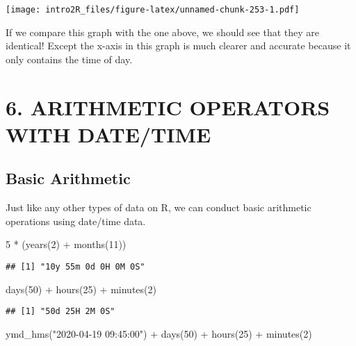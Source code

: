\documentclass[
]{book}
\newenvironment{Shaded}{\begin{snugshade}}{\end{snugshade}}
\newcommand{\DecValTok}[1]{\textcolor[rgb]{0.00,0.00,0.81}{#1}}
\newcommand{\FunctionTok}[1]{\textcolor[rgb]{0.00,0.00,0.00}{#1}}
\newcommand{\NormalTok}[1]{#1}
\newcommand{\SpecialCharTok}[1]{\textcolor[rgb]{0.00,0.00,0.00}{#1}}
\newcommand{\StringTok}[1]{\textcolor[rgb]{0.31,0.60,0.02}{#1}}
\begin{document}
\texttt{[image: intro2R\_files/figure-latex/unnamed-chunk-253-1.pdf]}

If we compare this graph with the one above, we should see that they are identical! Except the x-axis in this graph is much clearer and accurate because it only contains the time of day.

\hypertarget{arithmetic-operators-with-datetime}{%
\section{6. ARITHMETIC OPERATORS WITH DATE/TIME}\label{arithmetic-operators-with-datetime}}

\hypertarget{basic-arithmetic}{%
\subsection{Basic Arithmetic}\label{basic-arithmetic}}

Just like any other types of data on R, we can conduct basic arithmetic operations using date/time data.

\begin{Shaded}
\begin{Highlighting}[]
\DecValTok{5} \SpecialCharTok{*}\NormalTok{ (}\FunctionTok{years}\NormalTok{(}\DecValTok{2}\NormalTok{) }\SpecialCharTok{+} \FunctionTok{months}\NormalTok{(}\DecValTok{11}\NormalTok{))}
\end{Highlighting}
\end{Shaded}

\begin{verbatim}
## [1] "10y 55m 0d 0H 0M 0S"
\end{verbatim}

\begin{Shaded}
\begin{Highlighting}[]
\FunctionTok{days}\NormalTok{(}\DecValTok{50}\NormalTok{) }\SpecialCharTok{+} \FunctionTok{hours}\NormalTok{(}\DecValTok{25}\NormalTok{) }\SpecialCharTok{+} \FunctionTok{minutes}\NormalTok{(}\DecValTok{2}\NormalTok{)}
\end{Highlighting}
\end{Shaded}

\begin{verbatim}
## [1] "50d 25H 2M 0S"
\end{verbatim}

\begin{Shaded}
\begin{Highlighting}[]
\FunctionTok{ymd\_hms}\NormalTok{(}\StringTok{"2020{-}04{-}19 09:45:00"}\NormalTok{) }\SpecialCharTok{+}
    \FunctionTok{days}\NormalTok{(}\DecValTok{50}\NormalTok{) }\SpecialCharTok{+} \FunctionTok{hours}\NormalTok{(}\DecValTok{25}\NormalTok{) }\SpecialCharTok{+} \FunctionTok{minutes}\NormalTok{(}\DecValTok{2}\NormalTok{)}
\end{Highlighting}
\end{Shaded}
\end{document}

